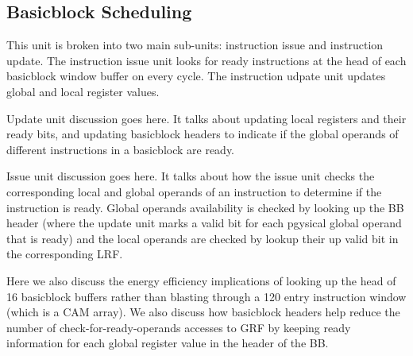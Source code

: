 \subsection{Basicblock Scheduling}
\label{sec:scheduling}

This unit is broken into two main sub-units: instruction issue and instruction
update. The instruction issue unit looks for ready instructions at the
head of each basicblock window buffer on every cycle. The instruction udpate
unit updates global and local register values.

Update unit discussion goes here. It talks about updating local registers and
their ready bits, and updating basicblock headers to indicate if the global
operands of different instructions in a basicblock are ready.

Issue unit discussion goes here. It talks about how the issue unit checks the
corresponding local and global operands of an instruction to determine if the
instruction is ready. Global operands availability is checked by looking up the
BB header (where the update unit marks a valid bit for each pgysical global
operand that is ready) and the local operands are checked by lookup
their up valid bit in the corresponding LRF. 

Here we also discuss the energy efficiency implications of looking up the head
of 16 basicblock buffers rather than blasting through a 120 entry instruction
window (which is a CAM array). We also discuss how basicblock headers help
reduce the number of check-for-ready-operands accesses to GRF by keeping ready
information for each global register value in the header of the BB.
